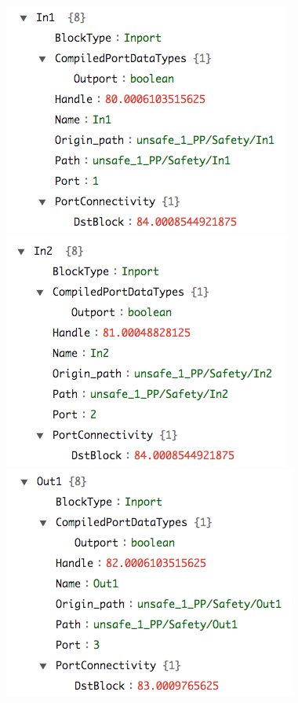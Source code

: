 \documentclass{article}
\begin{document}
\begin{figure}[h]
\begin{center}
  \includegraphics[scale=0.35]{figures/safety1}
    \includegraphics[scale=0.35]{figures/safety2}
  \includegraphics[scale=0.35]{figures/safety4}     

\end{center}
\end{figure}
\end{document}
